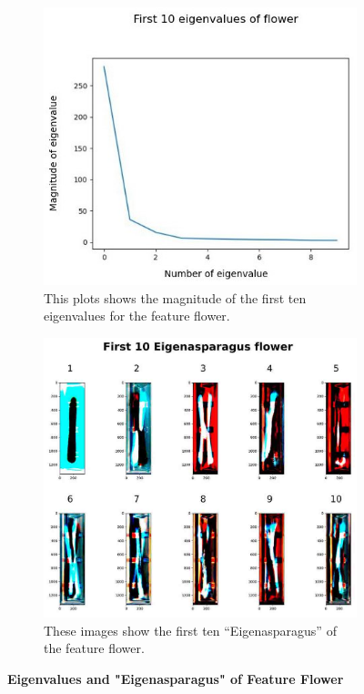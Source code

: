 \begin{figure}[H]
	\centering
	\begin{subfigure}{0.7\textwidth}
		\includegraphics[width=0.9\linewidth]{Figures/chapter04/pca_flower_graph.png} 
		\caption{This plots shows the magnitude of the first ten eigenvalues for the feature flower.}
	\end{subfigure}
	\vspace{20pt}
	
	\begin{subfigure}{0.9\textwidth}
		\includegraphics[width=0.9\linewidth]{Figures/chapter04/pca_flower.png}
		\caption{These images show the first ten “Eigenasparagus” of the feature flower.}
	\end{subfigure}
    \caption[First ten eigenvalues and "Eigenasparagus" of Feature Flower]{\textbf{Eigenvalues and "Eigenasparagus" of Feature Flower}}
    \label{fig:PCAflower}
\end{figure}

